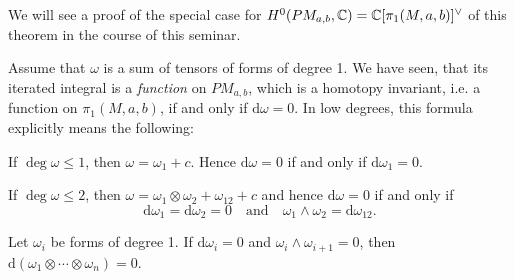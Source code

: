 We will see a proof of the special case for $H^0(PM_{a,b},\mathbb{C})=\mathbb{C}[\pi_1(M,a,b)]^\vee$ of this theorem in the course of this seminar.

\begin{exam}
Assume that $\omega$ is a sum of tensors of forms of degree 1. We have seen, that its iterated integral is a {\em function} on $PM_{a,b}$, which
is a homotopy invariant, i.e. a function on $\pi_1(M, a, b)$, if and only if $\mathrm{d}\omega = 0$.
In low degrees, this formula explicitly means the following:

\noindent If $\deg \omega \leq 1$, then $\omega = \omega_1 + c$. Hence $\mathrm{d}\omega = 0$ if and only if $\mathrm{d}\omega_1 = 0$.

\noindent If $\deg \omega \leq 2$, then $\omega = \omega_1 \otimes \omega_2 + \omega_{12} + c$ and hence $\mathrm{d}\omega = 0$ if and only if
\[
\mathrm{d}\omega_1 = \mathrm{d}\omega_2 = 0 \quad \textrm{and} \quad \omega_1 \wedge \omega_2 = \mathrm{d}\omega_{12}.
\]
\end{exam}

\begin{exam} Let $\omega_i$ be forms of degree 1.
If $\mathrm{d} \omega_i = 0$ and $\omega_i \wedge \omega_{i+1} = 0$, then $\mathrm{d} (\omega_1 \otimes \cdots \otimes \omega_n) = 0$.
\end{exam}


